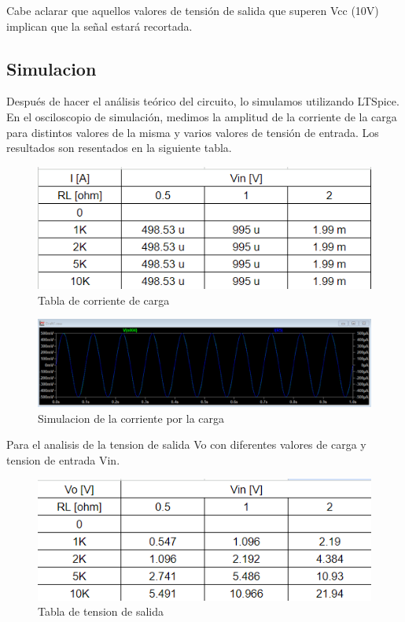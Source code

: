 Cabe aclarar que aquellos valores de tensión de salida que superen Vcc (10V) implican que la señal estará recortada.


\subsection{Simulacion}
Después de hacer el análisis teórico del circuito, lo simulamos utilizando LTSpice. En el osciloscopio de simulación, medimos la amplitud de la corriente de la carga para distintos valores de la misma y varios valores de tensión de entrada. Los resultados son resentados en la siguiente tabla.

\begin{figure}[h!]
    \centering
    \includegraphics[width=0.70\linewidth]{Secciones/Circuito2/tabla1.png}
    \caption{Tabla de corriente de carga}
    \label{fig:Circuito2Tabla1}
\end{figure}

\begin{figure}[h!]
    \centering
    \includegraphics[width=0.70\linewidth]{Secciones/Circuito2/simulacion.png}
    \caption{Simulacion de la corriente por la carga}
    \label{fig:Circuito2Simulacion}
\end{figure}

Para el analisis de la tension de salida Vo con diferentes valores de carga y tension de entrada Vin. 

\begin{figure}[h!]
    \centering
    \includegraphics[width=0.70\linewidth]{Secciones/Circuito2/tabla2.png}
    \caption{Tabla de tension de salida}
    \label{fig:Circuito2Tabla2}
\end{figure}


